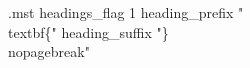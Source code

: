 \AtBeginDocument{%
\renewcommand{\chapterautorefname}{Chap.}
\renewcommand{\sectionautorefname}{Sect.}
\renewcommand{\subsectionautorefname}{Sect.}
\renewcommand{\figureautorefname}{Fig.}
\newcommand{\definitionautorefname}{Def.}
\newcommand{\algorithmautorefname}{Algo.}
\newcommand{\notationautorefname}{Notation}}


\renewcommand{\glsdescwidth}{12cm}

\makeatletter
\renewenvironment{theindex}
{{\chapter{\indexname}\label{sec:app:index}}\par%
\@mkboth{\MakeUppercase\indexname}{\MakeUppercase\indexname}%
\parindent\z@
\parskip\z@ \@plus .3\p@\relax
\let\item\@idxitem
\setlength{\columnsep}{20pt}
\begin{multicols}{2}}
{\end{multicols}}
\makeatother
\begin{filecontents}{\jobname.mst}
headings_flag 1
heading_prefix "\\textbf\{"
heading_suffix "\}\\nopagebreak\n"
\end{filecontents}
